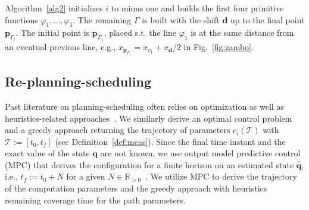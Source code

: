 \documentclass[letterpaper,10pt,journal,twoside]{IEEEtran}
\theoremstyle{definition}
\begin{document}
Algorithm~\ref{alg2} initializes $i$ to minus one and builds the first four primitive functions $\varphi_1,\dots,\varphi_4$. The remaining $\Gamma$ is built with the shift $\mathbf{d}$ up to the final point $\mathbf{p}_{\Gamma_l}$. The initial point is $\mathbf{p}_{\Gamma_1}$, placed s.t. the line $\varphi_1$ is at the same distance from an eventual previous line, e.g., $x_{\mathbf{p}_{\Gamma_1}}=x_{v_1}+x_{\mathbf{d}}/2$ in Fig.~\ref{fig:zambo}.

\vspace*{-1.4ex}
\subsection{Re-planning-scheduling}
\label{sec:repla-algo}

Past literature on planning-scheduling often relies on %
optimization {\color{blue} as well as heuristics-}related approaches~\cite{brateman2006energy,zhang2007low,ondruska2015scheduled,lahijanian2018resource}. We similarly derive an optimal control problem {\color{blue}and a greedy approach} returning the trajectory of parameters $c_i(\mathcal{T})$ with $\mathcal{T}:=[t_0,t_f]$ (see Definition~\ref{def:meas}). Since the final time instant and the exact value of the state $\mathbf{q}$ are not known, we use %
output model predictive control (MPC) that derives the configuration for a finite horizon on an estimated state $\hat{\mathbf{q}}$, i.e., $t_f:=t_0+N$ for a given $N\in\mathbb{R}_{>0}$~\cite{rawlings2017model}. {\color{blue} We utilize MPC to derive the trajectory of the computation parameters and the greedy approach with heuristics remaining coverage time for the path parameters.}
\end{document}
